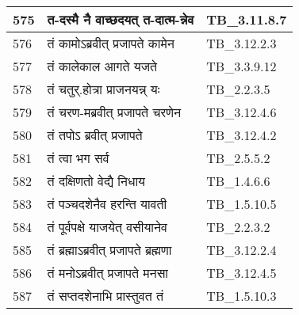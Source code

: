 \documentclass[17pt]{extarticle}
\begin{document}
\begin{longtable}{||p{0.4in}||p{4.9in}||p{0.9in}||}
    \hline
        
    575 & त{-}दस्मै नै वाच्छदयत् त{-}दात्म{-}न्नेव & TB\_3.11.8.7       \\
    
    \hline
        
    576 & तं कामोऽब्रवीत् प्रजापते कामेन & TB\_3.12.2.3       \\
    
    \hline
        
    577 & तं कालेकाल आगते यजते & TB\_3.3.9.12       \\
    
    \hline
        
    578 & तं चतुर्.होत्रा प्राजनयन्न् यः & TB\_2.2.3.5       \\
    
    \hline
        
    579 & तं चरण{-}मब्रवीत् प्रजापते चरणेन & TB\_3.12.4.6       \\
    
    \hline
        
    580 & तं तपोऽ ब्रवीत् प्रजापते & TB\_3.12.4.2       \\
    
    \hline
        
    581 & तं त्वा भग सर्व & TB\_2.5.5.2       \\
    
    \hline
        
    582 & तं दक्षिणतो वेद्यै निधाय & TB\_1.4.6.6       \\
    
    \hline
        
    583 & तं पञ्चदशेनैव हरन्ति यावती & TB\_1.5.10.5       \\
    
    \hline
        
    584 & तं पूर्वपक्षे याजयेत् वसीयानेव & TB\_2.2.3.2       \\
    
    \hline
        
    585 & तं ब्रह्माऽब्रवीत् प्रजापते ब्रह्मणा & TB\_3.12.2.4       \\
    
    \hline
        
    586 & तं मनोऽब्रवीत् प्रजापते मनसा & TB\_3.12.4.5       \\
    
    \hline
        
    587 & तं सप्तदशेनाभि प्रास्तुवत तं & TB\_1.5.10.3       \\
    

\end{longtable}
\end{document}
